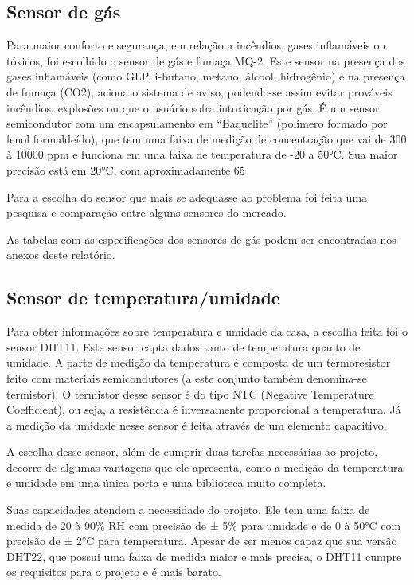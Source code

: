 \subsection{Sensor de gás}
\par Para maior conforto e segurança, em relação a incêndios, gases inflamáveis ou tóxicos, foi escolhido o sensor de gás e fumaça MQ-2. Este sensor na presença dos gases inflamáveis (como GLP, i-butano, metano, álcool, hidrogênio) e na presença de fumaça (CO2), aciona o sistema de aviso, podendo-se assim evitar prováveis incêndios, explosões ou que o usuário sofra intoxicação por gás.  É um sensor semicondutor com um encapsulamento em “Baquelite” (polímero formado por fenol formaldeído), que tem uma faixa de medição de concentração que vai de 300 à 10000 ppm e funciona em uma faixa de temperatura de -20 a 50°C. Sua maior precisão está em 20°C, com aproximadamente 65%
\par Para a escolha do sensor que mais se adequasse ao problema foi feita uma pesquisa e comparação entre alguns sensores do mercado.
\par As tabelas com as especificações dos sensores de gás podem ser encontradas nos anexos deste relatório.

\subsection{Sensor de temperatura/umidade}
\par Para obter informações sobre temperatura e umidade da casa, a escolha feita foi o sensor DHT11. Este sensor capta dados tanto de temperatura quanto de umidade. A parte de medição da temperatura é composta de um termoresistor feito com materiais semicondutores (a este conjunto também denomina-se termistor). O termistor desse sensor é do tipo NTC (Negative Temperature Coefficient), ou seja, a resistência é inversamente proporcional a temperatura. Já a medição da umidade nesse sensor é feita através de um elemento capacitivo.
\par A escolha desse sensor, além de cumprir duas tarefas necessárias ao projeto, decorre de algumas vantagens que ele apresenta, como a medição da temperatura e umidade em uma única porta e uma biblioteca muito completa.
\par Suas capacidades atendem a necessidade do projeto. Ele tem uma faixa de medida de 20 à 90\% RH com precisão de ± 5\% para umidade e de 0 à 50°C com precisão de ± 2°C para temperatura. Apesar de ser menos capaz que sua versão DHT22, que possui uma faixa de medida maior e mais precisa, o DHT11 cumpre os requisitos para o projeto e é mais barato.

